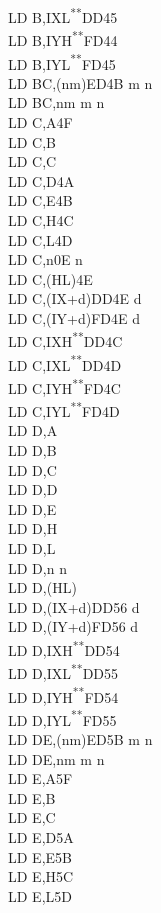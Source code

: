 \documentclass[12pt,twoside,openright,a4paper]{book}
\newcommand{\UNDOC}{\textnormal{\textsuperscript{**}}}
\begin{document}
\begin{multicols}{3}
{\begin{tabbing}
		LD B,IXL\UNDOC\>DD45\\
		LD B,IYH\UNDOC\>FD44\\
		LD B,IYL\UNDOC\>FD45\\
		LD BC,(nm)\>ED4B m n\\
		LD BC,nm m n\\
		LD C,A\>4F\\
		LD C,B\\
		LD C,C\\
		LD C,D\>4A\\
		LD C,E\>4B\\
		LD C,H\>4C\\
		LD C,L\>4D\\
		LD C,n\>0E n\\
		LD C,(HL)\>4E\\
		LD C,(IX+d)\>DD4E d\\
		LD C,(IY+d)\>FD4E d\\
		LD C,IXH\UNDOC\>DD4C\\
		LD C,IXL\UNDOC\>DD4D\\
		LD C,IYH\UNDOC\>FD4C\\
		LD C,IYL\UNDOC\>FD4D\\
		LD D,A\\
		LD D,B\\
		LD D,C\\
		LD D,D\\
		LD D,E\\
		LD D,H\\
		LD D,L\\
		LD D,n n\\
		LD D,(HL)\\
		LD D,(IX+d)\>DD56 d\\
		LD D,(IY+d)\>FD56 d\\
		LD D,IXH\UNDOC\>DD54\\
		LD D,IXL\UNDOC\>DD55\\
		LD D,IYH\UNDOC\>FD54\\
		LD D,IYL\UNDOC\>FD55\\
		LD DE,(nm)\>ED5B m n\\
		LD DE,nm m n\\
		LD E,A\>5F\\
		LD E,B\\
		LD E,C\\
		LD E,D\>5A\\
		LD E,E\>5B\\
		LD E,H\>5C\\
		LD E,L\>5D\\

\end{tabbing}}
\end{multicols}
\end{document}
